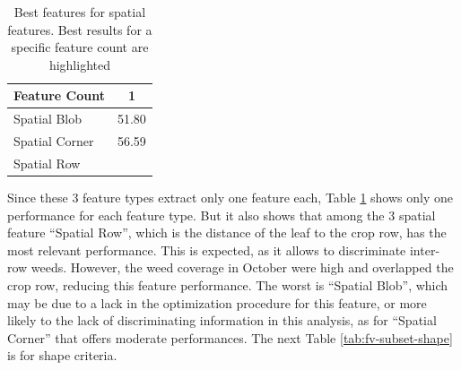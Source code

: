 \documentclass[../thesis.tex]{subfiles}
\begin{document}
    \begin{table}[H]
        \centering
        \begin{tabular}{l c}
            \hline
            \textbf{Feature Count} & \textbf{1} \\
            \hline
            Spatial Blob & 51.80 \\
            Spatial Corner & 56.59 \\
            Spatial Row & \cellcolor{green!30}{66.90} \\
            \hline
        \end{tabular}
        \caption{Best features for spatial features. Best results for a specific feature count are highlighted}
        \label{tab:fv-subset-spatial}
    \end{table}
    
    Since these 3 feature types extract only one feature each, Table \ref{tab:fv-subset-spatial} shows only one performance for each feature type. But it also shows that among the 3 spatial feature ``Spatial Row'', which is the distance of the leaf to the crop row, has the most relevant performance. This is expected, as it allows to discriminate inter-row weeds. However, the weed coverage in October were high and overlapped the crop row, reducing this feature performance. The worst is ``Spatial Blob'', which may be due to a lack in the optimization procedure for this feature, or more likely to the lack of discriminating information in this analysis, as for ``Spatial Corner'' that offers moderate performances. The next Table \ref{tab:fv-subset-shape} is for shape criteria.
    
\end{document}
